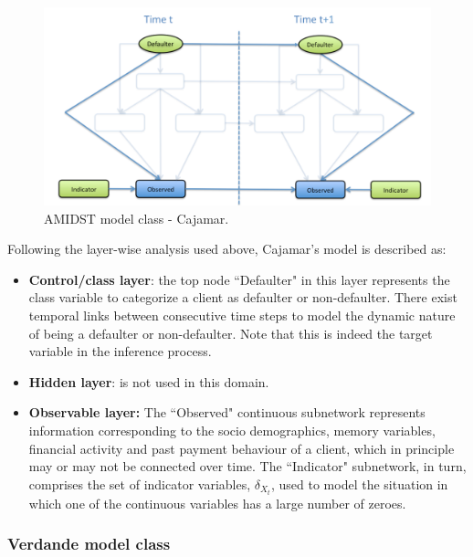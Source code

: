 \begin{figure}[ht!]
\begin{center}
\includegraphics[scale=0.39]{./figures/AMIDSTModelClassCajamar.png}
\caption{\label{Figure:AMIDSTModelClassCajamar} AMIDST model class - Cajamar.}
\end{center}
\end{figure}


Following the layer-wise analysis used above, Cajamar's model is described as:
\begin{itemize}

\item \textbf{Control/class layer}: the top node ``Defaulter" in this layer represents the class variable to categorize a client as defaulter or non-defaulter. There exist temporal links between consecutive time steps to model the dynamic nature of being a defaulter or non-defaulter. Note that this is indeed the target variable in the inference process.

\item \textbf{Hidden layer}: is not used in this domain.

\item \textbf{Observable layer:} The ``Observed" continuous subnetwork represents information corresponding to the socio demographics, memory variables, financial activity and past payment behaviour of a client, which in principle may or may not be connected over time. The ``Indicator" subnetwork, in turn, comprises the set of indicator variables, $\delta_{X_t}$, used to model the situation in which one of the continuous variables has a large number of zeroes.

\end{itemize}



\subsubsection{Verdande model class}\label{verdandeAMIDSTModels}

